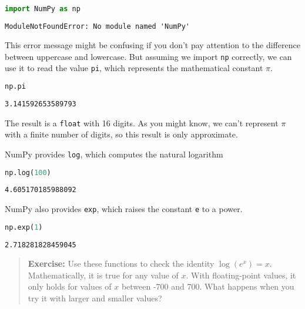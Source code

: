 \begin{lstlisting}[language=Python,style=source]
%%expect ModuleNotFoundError

import NumPy as np
\end{lstlisting}

\begin{lstlisting}[style=output]
ModuleNotFoundError: No module named 'NumPy'
\end{lstlisting}

This error message might be confusing if you don't pay attention to the
difference between uppercase and lowercase. But assuming we import
\passthrough{\lstinline!np!} correctly, we can use it to read the value
\passthrough{\lstinline!pi!}, which represents the mathematical constant
\(\pi\).

\begin{lstlisting}[language=Python,style=source]
np.pi
\end{lstlisting}

\begin{lstlisting}[style=output]
3.141592653589793
\end{lstlisting}

The result is a \passthrough{\lstinline!float!} with 16 digits. As you
might know, we can't represent \(\pi\) with a finite number of digits,
so this result is only approximate.

NumPy provides \passthrough{\lstinline!log!}, which computes the natural
logarithm

\begin{lstlisting}[language=Python,style=source]
np.log(100)
\end{lstlisting}

\begin{lstlisting}[style=output]
4.605170185988092
\end{lstlisting}

NumPy also provides \passthrough{\lstinline!exp!}, which raises the
constant \passthrough{\lstinline!e!} to a power.

\begin{lstlisting}[language=Python,style=source]
np.exp(1)
\end{lstlisting}

\begin{lstlisting}[style=output]
2.718281828459045
\end{lstlisting}

\begin{quote}
\textbf{Exercise:} Use these functions to check the identity
\(\log(e^x) = x\). Mathematically, it is true for any value of \(x\).
With floating-point values, it only holds for values of \(x\) between
-700 and 700. What happens when you try it with larger and smaller
values?
\end{quote}

